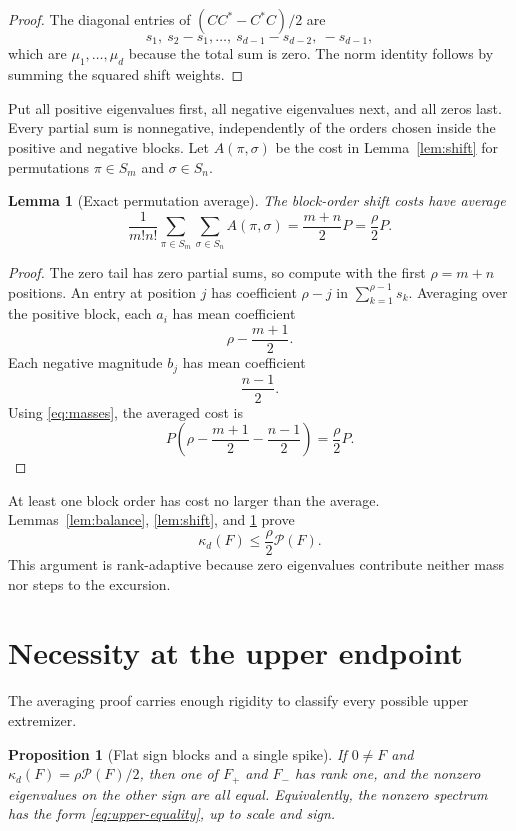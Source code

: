 \documentclass[11pt]{article}
\newtheorem{proposition}[theorem]{Proposition}
\newtheorem{lemma}[theorem]{Lemma}
\theoremstyle{definition}
\theoremstyle{remark}
\newcommand{\1}{\mathbf 1}
\newcommand{\PP}{\mathcal P}
\begin{document}
\begin{proof}
The diagonal entries of $(CC^*-C^*C)/2$ are
\[
 s_1,\ s_2-s_1,\ldots,\ s_{d-1}-s_{d-2},\ -s_{d-1},
\]
which are $\mu_1,\ldots,\mu_d$ because the total sum is zero.  The norm identity follows by summing the squared shift weights.
\end{proof}

Put all positive eigenvalues first, all negative eigenvalues next, and all zeros last.  Every partial sum is nonnegative, independently of the orders chosen inside the positive and negative blocks.  Let $A(\pi,\sigma)$ be the cost in Lemma~\ref{lem:shift} for permutations $\pi\in S_m$ and $\sigma\in S_n$.

\begin{lemma}[Exact permutation average]
\label{lem:average}
The block-order shift costs have average
\begin{equation}
 \frac1{m!n!}\sum_{\pi\in S_m}\sum_{\sigma\in S_n}A(\pi,\sigma)
 =\frac{m+n}{2}P=\frac\rho2P.
 \label{eq:average}
\end{equation}
\end{lemma}

\begin{proof}
The zero tail has zero partial sums, so compute with the first $\rho=m+n$ positions.  An entry at position $j$ has coefficient $\rho-j$ in $\sum_{k=1}^{\rho-1}s_k$.  Averaging over the positive block, each $a_i$ has mean coefficient
\[
 \rho-\frac{m+1}{2}.
\]
Each negative magnitude $b_j$ has mean coefficient
\[
 \frac{n-1}{2}.
\]
Using \eqref{eq:masses}, the averaged cost is
\[
 P\left(\rho-\frac{m+1}{2}-\frac{n-1}{2}\right)=\frac\rho2P.
\]
\end{proof}

At least one block order has cost no larger than the average.  Lemmas~\ref{lem:balance}, \ref{lem:shift}, and \ref{lem:average} prove
\begin{equation}
 \kappa_d(F)\le\frac\rho2\PP(F).
 \label{eq:upper}
\end{equation}
This argument is rank-adaptive because zero eigenvalues contribute neither mass nor steps to the excursion.

\section{Necessity at the upper endpoint}

The averaging proof carries enough rigidity to classify every possible upper extremizer.

\begin{proposition}[Flat sign blocks and a single spike]
\label{prop:necessity}
If $0\ne F$ and $\kappa_d(F)=\rho\PP(F)/2$, then one of $F_+$ and $F_-$ has rank one, and the nonzero eigenvalues on the other sign are all equal.  Equivalently, the nonzero spectrum has the form \eqref{eq:upper-equality}, up to scale and sign.
\end{proposition}
\end{document}
